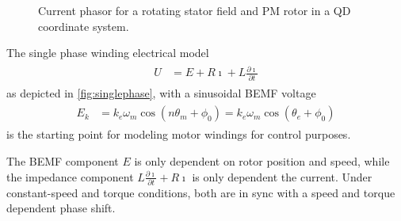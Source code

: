 \documentclass[12pt,a4paper,oneside,openany]{article}
\begin{document}
\begin{figure}[htbp]
\begin{center}
\caption[Phasors]{Current phasor for a rotating stator field and PM rotor in a QD coordinate system.}
\end{center}
\end{figure}

The single phase winding electrical model
\begin{gather}
\begin{aligned}
\label{eq:singlephase} 
U &= E + R \imath + L \frac{\partial \imath}{\partial t}
\end{aligned}
\end{gather}
as depicted in \cref{fig:singlephase}, with a sinusoidal BEMF voltage
\begin{gather}
\begin{aligned}
\label{eq:sineemf} 
E_k &= k_e \omega_m \cos \left( n \theta_m + \phi_{0} \right) = k_e \omega_m \cos \left( \theta_{e} + \phi_0 \right)
\end{aligned}
\end{gather}
is the starting point for modeling motor windings for control purposes.

The BEMF component $E$ is only dependent on rotor position and speed, while the impedance component $L \frac{\partial \imath}{\partial t} + R\imath$ is only dependent the current. Under constant-speed and torque conditions, both are in sync with a speed and torque dependent phase shift.
\end{document}
